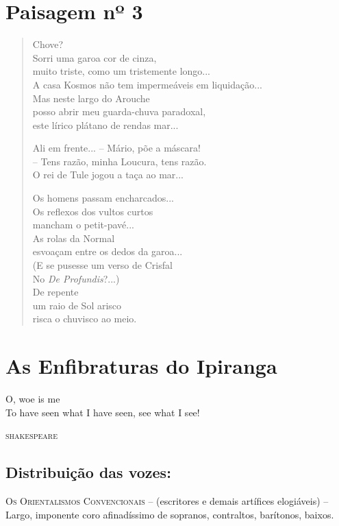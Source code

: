 \chapter{Paisagem nº 3}

\begin{verse}
Chove?\\
Sorri uma garoa cor de cinza,\\
muito triste, como um tristemente longo...\\
A casa Kosmos não tem impermeáveis em liquidação...\\
Mas neste largo do Arouche\\
posso abrir meu guarda-chuva paradoxal,\\
este lírico plátano de rendas mar...

Ali em frente... -- Mário, põe a máscara!\\
-- Tens razão, minha Loucura, tens razão.\\
O rei de Tule jogou a taça ao mar...

Os homens passam encharcados...\\
Os reflexos dos vultos curtos\\
mancham o petit-pavé...\\
As rolas da Normal\\
esvoaçam entre os dedos da garoa...\\
(E se pusesse um verso de Crisfal\\
No \emph{De Profundis}?...)\\
De repente\\
um raio de Sol arisco\\
risca o chuvisco ao meio.
\end{verse}

\chapter[As Enfibraturas do Ipiranga]{As Enfibraturas do Ipiranga }


\epigraph{O, woe is me\\
To have seen what I have seen, see what I see!}{\textsc{shakespeare}}

\section*{Distribuição das vozes:}

\textsc{Os Orientalismos Convencionais} -- (escritores e demais
artífices elogiáveis) -- Largo, imponente coro afinadíssimo de sopranos,
contraltos, barítonos, baixos.

